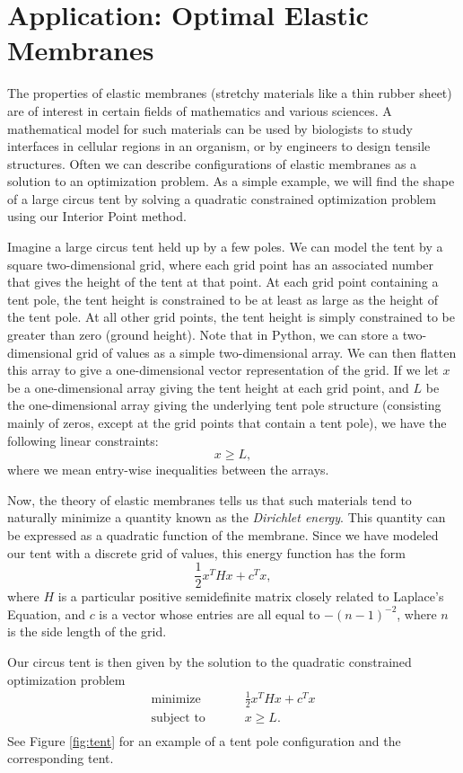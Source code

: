 \section*{Application: Optimal Elastic Membranes}
The properties of elastic membranes (stretchy materials like a thin rubber sheet) are of interest in
certain fields of mathematics and various sciences. A mathematical model for
such materials can be used by biologists to study interfaces in cellular regions in an organism, or by engineers
to design tensile structures. Often we can describe configurations of elastic membranes as a solution to an
optimization problem. As a simple example, we will find the shape of a large circus tent by solving a quadratic
constrained optimization problem using our Interior Point method.

Imagine a large circus tent held up by a few poles. We can model the tent by a square two-dimensional grid,
where each grid point has an associated number that gives the height of the tent at that point. At each
grid point containing a tent pole, the tent height is constrained to be at least as large as the height of
the tent pole. At all other grid points, the tent height is simply constrained to be greater than zero (ground height).
Note that in Python, we can store a two-dimensional grid of values as a simple two-dimensional array.
We can then flatten this array to give a one-dimensional vector representation of the grid.
If we let $x$ be a one-dimensional array giving the tent height at each grid point, and $L$ be the one-dimensional
array giving the underlying tent pole structure (consisting mainly of zeros, except at the grid points that contain
a tent pole), we have the following linear constraints:
\[
x \geq L,
\]
where we mean entry-wise inequalities between the arrays.

Now, the theory of elastic membranes tells us that such materials tend to naturally minimize a quantity known
as the \emph{Dirichlet energy}. This quantity can be expressed as a quadratic function of the membrane.
Since we have modeled our tent with a discrete grid of values, this energy function has the form
\[
\frac{1}{2}x^T H x + c^T x,
\]
where $H$ is a particular positive semidefinite matrix closely related to Laplace's Equation, and $c$ is a
vector whose entries are all equal to $-(n-1)^{-2}$, where $n$ is the side length of the grid.

Our circus tent is then given by the solution to the quadratic constrained optimization problem
\begin{align*}
\text{minimize }\qquad &\frac{1}{2}x^T H x + c^T x\\
\text{subject to }\qquad &x \geq L.\\
\end{align*}
See Figure \ref{fig:tent} for an example of a tent pole configuration and the corresponding tent.

